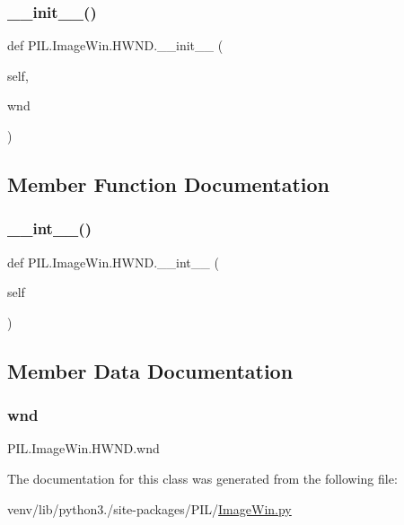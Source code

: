 \subsubsection{\texorpdfstring{\+\_\+\+\_\+init\+\_\+\+\_\+()}{\_\_init\_\_()}}
{\footnotesize\ttfamily def P\+I\+L.\+Image\+Win.\+H\+W\+N\+D.\+\_\+\+\_\+init\+\_\+\+\_\+ (\begin{DoxyParamCaption}\item[{}]{self,  }\item[{}]{wnd }\end{DoxyParamCaption})}



\subsection{Member Function Documentation}
\mbox{\label{classPIL_1_1ImageWin_1_1HWND_ad872ec944147059ffec9ce7e78b77840}} 
\subsubsection{\texorpdfstring{\+\_\+\+\_\+int\+\_\+\+\_\+()}{\_\_int\_\_()}}
{\footnotesize\ttfamily def P\+I\+L.\+Image\+Win.\+H\+W\+N\+D.\+\_\+\+\_\+int\+\_\+\+\_\+ (\begin{DoxyParamCaption}\item[{}]{self }\end{DoxyParamCaption})}



\subsection{Member Data Documentation}
\mbox{\label{classPIL_1_1ImageWin_1_1HWND_a8bcabd2eeed7e177672d2b4e2cb072a6}} 
\subsubsection{\texorpdfstring{wnd}{wnd}}
{\footnotesize\ttfamily P\+I\+L.\+Image\+Win.\+H\+W\+N\+D.\+wnd}



The documentation for this class was generated from the following file\+:\begin{DoxyCompactItemize}
\item 
venv/lib/python3./site-\/packages/\+P\+I\+L/\hyperlink{ImageWin_8py}{Image\+Win.\+py}\end{DoxyCompactItemize}
